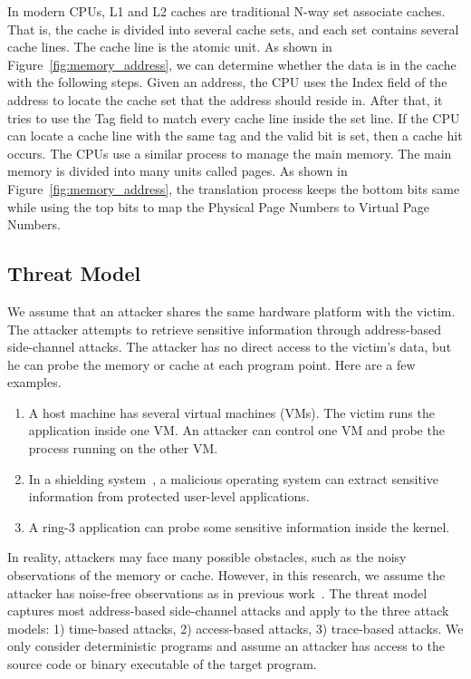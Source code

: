 In modern CPUs, L1 and L2 caches are traditional N-way set associate caches. That is, the cache is divided into several cache sets, and each set contains several cache lines. The cache line is the atomic unit. As shown in Figure~\ref{fig:memory_address}, we can determine whether the data is in the cache with the following steps.  Given an address, the CPU uses the \textsf{Index} field of the address to locate the cache set that the address should reside in. After that, it tries to use the \textsf{Tag} field to match every cache line inside the set line. If the CPU can locate a cache line with the same tag and the valid bit is set, then a cache hit occurs. The CPUs use a similar process to manage the main memory. The main memory is divided into many units called pages. As shown in Figure~\ref{fig:memory_address},
the translation process keeps the bottom bits same while using the top bits to map the Physical Page Numbers to Virtual Page Numbers. 

\subsection{Threat Model}
We assume that an attacker shares the same hardware platform with the victim.
The attacker attempts to retrieve sensitive information through address-based side-channel attacks. The attacker has no direct access to the victim's data, but he can probe the memory or cache at each program point. Here are a few examples.
\begin{enumerate}
  \item A host machine has several virtual machines (VMs). The victim runs the application inside one VM. An attacker can control one VM and probe the process running on the other VM.
  \item  In a shielding system~\cite{arnautov2016scone,schuster2015vc3}, a malicious operating system can extract sensitive information from protected user-level applications.
  \item A ring-3 application can probe some sensitive information inside the kernel.
\end{enumerate}

In reality, attackers may face many possible obstacles, such as the noisy observations of the memory or cache. However, in this research, we assume the attacker has noise-free observations as in previous work~\cite{203878,182946,Brotzman19Casym}. The threat model captures most address-based side-channel attacks and apply to the three attack models: 1) time-based attacks, 2) access-based attacks, 3) trace-based attacks. We only consider deterministic programs and assume an attacker has access to the source code or binary executable of the target program.

